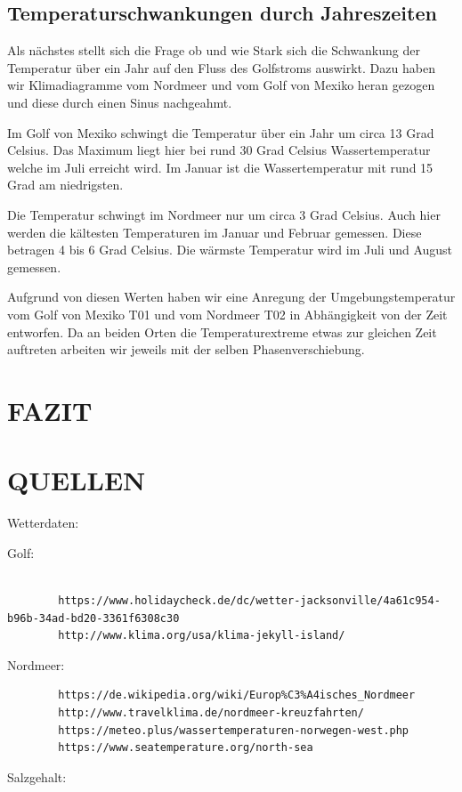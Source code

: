 \documentclass[a4paper,twoside]{article}
\begin{document}
	\subsection{Temperaturschwankungen durch Jahreszeiten}
	
	Als nächstes stellt sich die Frage ob und wie Stark sich die Schwankung der Temperatur über ein Jahr auf den Fluss des Golfstroms auswirkt. Dazu haben wir Klimadiagramme vom Nordmeer und vom Golf von Mexiko heran gezogen und diese durch einen Sinus nachgeahmt. 
	
	Im Golf von Mexiko schwingt die Temperatur über ein Jahr um circa 13 Grad Celsius. Das Maximum liegt hier bei rund 30 Grad Celsius Wassertemperatur welche im Juli erreicht wird. Im Januar ist die Wassertemperatur mit rund 15 Grad am niedrigsten.
	
	Die Temperatur schwingt im Nordmeer nur um circa 3 Grad Celsius. Auch hier werden die kältesten Temperaturen im Januar und Februar gemessen. Diese betragen 4 bis 6 Grad Celsius. Die wärmste Temperatur wird im Juli und August gemessen. 
	
	Aufgrund von diesen Werten haben wir eine Anregung der Umgebungstemperatur vom Golf von Mexiko T01 und vom Nordmeer T02 in Abhängigkeit von der Zeit entworfen. Da an beiden Orten die Temperaturextreme etwas zur gleichen Zeit auftreten arbeiten wir jeweils mit der selben Phasenverschiebung. 
	


	\section{\uppercase{Fazit}}\label{sec:Fazit}
	
	
	
 	\section{\uppercase{Quellen}}\label{sec: Quellen}
	Wetterdaten: 
	
	\noindent Golf:
	\begin{verbatim}
		
		https://www.holidaycheck.de/dc/wetter-jacksonville/4a61c954-b96b-34ad-bd20-3361f6308c30  
		http://www.klima.org/usa/klima-jekyll-island/
	\end{verbatim}
	Nordmeer:
	\begin{verbatim}
		https://de.wikipedia.org/wiki/Europ%C3%A4isches_Nordmeer
		http://www.travelklima.de/nordmeer-kreuzfahrten/
		https://meteo.plus/wassertemperaturen-norwegen-west.php
		https://www.seatemperature.org/north-sea
	\end{verbatim}
	Salzgehalt:
	
\end{document}
